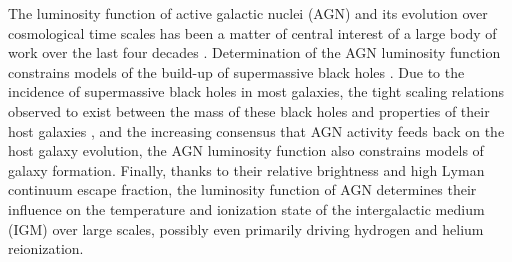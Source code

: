 \documentclass[a4paper,fleqn,usenatbib]{mnras}
\begin{document}
The luminosity function of active galactic nuclei (AGN) and its
evolution over cosmological time scales has been a matter of central
interest of a large body of work over the last four decades
\citep[e.g.,][]{1978A&A....68...17M, 1983ApJ...269..352S,
  1988ApJ...325...92K, 1988MNRAS.235..935B, 1993ApJ...406L..43H,
  1994ApJ...421..412W, 1995AJ....110...68S, 1995AJ....110.2553K,
  1995ApJ...438..623P, 2000MNRAS.317.1014B, 2001AJ....121...54F,
  2004AJ....128..515F, 2006AJ....131.2766R, 2007ApJ...654..731H,
  2009MNRAS.392...19C, 2010AJ....139..906W, 2011ApJ...728L..26G,
  2013ApJ...773...14R, 2013ApJ...768..105M, 2015AA...578A..83G,
  2015ApJ...798...28K, 2016ApJ...829...33Y, 2016ApJ...833..222J,
  2017MNRAS.466.1160M}.  Determination of the AGN luminosity function
constrains models of the build-up of supermassive black holes
\citep{2015MNRAS.452..575S, 2016MNRAS.462..190R}.  Due to the
incidence of supermassive black holes in most galaxies, the tight
scaling relations observed to exist between the mass of these black
holes and properties of their host galaxies
\citep{2013ARA&A..51..511K, 2013ApJ...764..184M}, and the increasing
consensus that AGN activity feeds back on the host galaxy evolution,
the AGN luminosity function also constrains models of galaxy
formation.  Finally, thanks to their relative brightness and high
Lyman continuum escape fraction, the luminosity function of AGN
determines their influence on the temperature and ionization state of
the intergalactic medium (IGM) over large scales, possibly even
primarily driving hydrogen and helium reionization.
\end{document}
